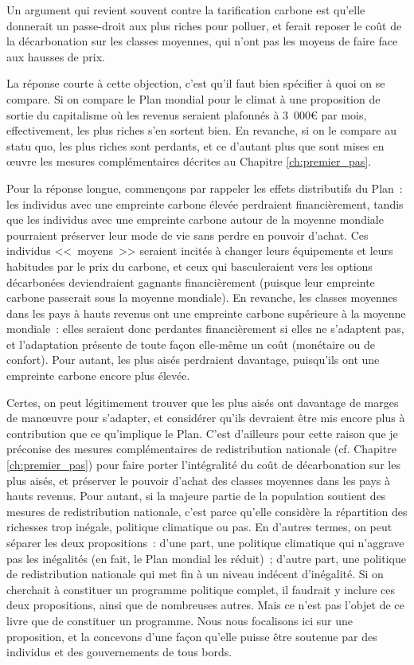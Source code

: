 \documentclass[a5paper,french]{memoir}
\begin{document}
Un argument qui revient souvent contre la tarification carbone est qu'elle donnerait un passe-droit aux plus riches pour polluer, et ferait reposer le coût de la décarbonation sur les classes moyennes, qui n'ont pas les moyens de faire face aux hausses de prix. 

La réponse courte à cette objection, c'est qu'il faut bien spécifier à quoi on se compare. Si on compare le Plan mondial pour le climat à une proposition de sortie du capitalisme où les revenus seraient plafonnés à 3~000\euro{} par mois, effectivement, les plus riches s'en sortent bien. En revanche, si on le compare au statu quo, les plus riches sont perdants, et ce d'autant plus que sont mises en œuvre les mesures complémentaires décrites au Chapitre \ref{ch:premier_pas}. 

Pour la réponse longue, commençons par rappeler les effets distributifs du Plan~: les individus avec une empreinte carbone élevée perdraient financièrement, tandis que les individus avec une empreinte carbone autour de la moyenne mondiale pourraient préserver leur mode de vie sans perdre en pouvoir d'achat. Ces individus <<~moyens~>> seraient incités à changer leurs équipements et leurs habitudes par le prix du carbone, et ceux qui basculeraient vers les options décarbonées deviendraient gagnants financièrement (puisque leur empreinte carbone passerait sous la moyenne mondiale). En revanche, les classes moyennes dans les pays à hauts revenus ont une empreinte carbone supérieure à la moyenne mondiale~: elles seraient donc perdantes financièrement si elles ne s'adaptent pas, et l'adaptation présente de toute façon elle-même un coût (monétaire ou de confort). Pour autant, les plus aisés perdraient davantage, puisqu'ils ont une empreinte carbone encore plus élevée. 

Certes, on peut légitimement trouver que les plus aisés ont davantage de marges de manœuvre pour s'adapter, et considérer qu'ils devraient être mis encore plus à contribution que ce qu'implique le Plan. C'est d'ailleurs pour cette raison que je préconise des mesures complémentaires de redistribution nationale (cf. Chapitre \ref{ch:premier_pas}) pour faire porter l'intégralité du coût de décarbonation sur les plus aisés, et préserver le pouvoir d'achat des classes moyennes dans les pays à hauts revenus. Pour autant, si la majeure partie de la population soutient des mesures de redistribution nationale, c'est parce qu'elle considère la répartition des richesses trop inégale, politique climatique ou pas. En d'autres termes, on peut séparer les deux propositions~: d'une part, une politique climatique qui n'aggrave pas les inégalités (en fait, le Plan mondial les réduit)~; d'autre part, une politique de redistribution nationale qui met fin à un niveau indécent d'inégalité. Si on cherchait à constituer un programme politique complet, il faudrait y inclure ces deux propositions, ainsi que de nombreuses autres. Mais ce n'est pas l'objet de ce livre que de constituer un programme. Nous nous focalisons ici sur une proposition, et la concevons d'une façon qu'elle puisse être soutenue par des individus et des gouvernements de tous bords. 
\end{document}
